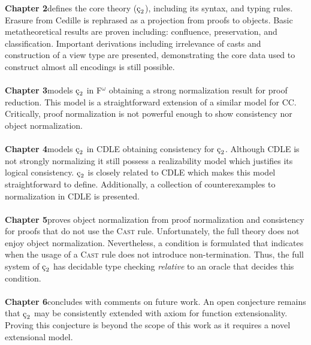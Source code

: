 \textbf{Chapter 2}\quad defines the core theory ($\ced$), including its syntax, and typing rules.
Erasure from Cedille is rephrased as a projection from proofs to objects.
Basic metatheoretical results are proven including: confluence, preservation, and classification.
Important derivations including irrelevance of casts and construction of a view type are presented, demonstrating the core data used to construct almost all encodings is still possible.
\\ \\
\textbf{Chapter 3}\quad models $\ced$ in F$^\omega$ obtaining a strong normalization result for proof reduction.
This model is a straightforward extension of a similar model for CC.
Critically, proof normalization is not powerful enough to show consistency nor object normalization.
\\ \\
\textbf{Chapter 4}\quad models $\ced$ in CDLE obtaining consistency for $\ced$.
Although CDLE is not strongly normalizing it still possess a realizability model which justifies its logical consistency.
$\ced$ is closely related to CDLE which makes this model straightforward to define.
Additionally, a collection of counterexamples to normalization in CDLE is presented.
\\ \\
\textbf{Chapter 5}\quad proves object normalization from proof normalization and consistency for proofs that do not use the \textsc{Cast} rule.
Unfortunately, the full theory does not enjoy object normalization.
Nevertheless, a condition is formulated that indicates when the usage of a \textsc{Cast} rule does not introduce non-termination.
Thus, the full system of $\ced$ has decidable type checking \textit{relative} to an oracle that decides this condition.
\\ \\
\textbf{Chapter 6}\quad concludes with comments on future work.
An open conjecture remains that $\ced$ may be consistently extended with axiom for function extensionality.
Proving this conjecture is beyond the scope of this work as it requires a novel extensional model.
